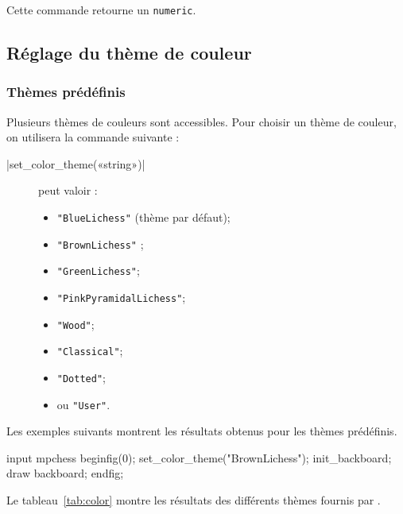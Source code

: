 \documentclass[french]{ltxdoc}
\begin{document}
Cette commande retourne un \lstinline+numeric+.

\subsection{Réglage du thème de couleur}

\subsubsection{Thèmes prédéfinis}

Plusieurs thèmes de couleurs sont accessibles. Pour choisir un thème de couleur, on utilisera la commande suivante :

\commande|set_color_theme(«string»)|\smallskip{}

\begin{description}
  \item[] peut valoir :
\begin{itemize}
\item \lstinline+"BlueLichess"+ (thème par défaut);
\item \lstinline+"BrownLichess"+ ;
\item \lstinline+"GreenLichess"+;
\item \lstinline+"PinkPyramidalLichess"+;
\item \lstinline+"Wood"+;
\item \lstinline+"Classical"+;
\item \lstinline+"Dotted"+;
\item ou \lstinline+"User"+.
\end{itemize}
\end{description}

Les exemples suivants montrent les résultats obtenus pour les thèmes prédéfinis.
\begin{ExempleMP}
input mpchess
beginfig(0);
set_color_theme("BrownLichess");
init_backboard;
draw backboard;
endfig;
\end{ExempleMP}

Le tableau~\ref{tab:color} montre les résultats des différents thèmes fournis
par \mpchess. 
\end{document}
